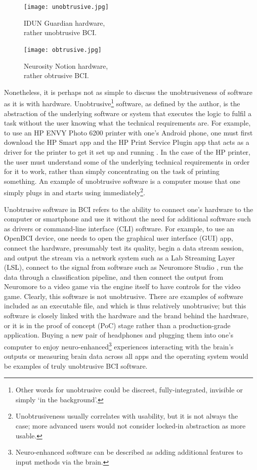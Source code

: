 \begin{figure}[!ht]
  \texttt{[image: unobtrusive.jpg]}
  \caption{IDUN Guardian hardware, \\ rather unobtrusive BCI.}
  \label{fig:unobstrusive-hardware}
  \endminipage\hfill
  \texttt{[image: obtrusive.jpg]}
  \caption{Neurosity Notion hardware, \\ rather obtrusive BCI.}
  \label{fig:obstrusive-hardware}
  \endminipage\hfill
\end{figure}

Nonetheless, it is perhaps not as simple to discuss the unobtrusiveness of software as it is with hardware. Unobtrusive\footnote{Other words for unobtrusive could be discreet, fully-integrated, invisible or simply ‘in the background’.} software, as defined by the author, is the abstraction of the underlying software or system that executes the logic to fulfil a task without the user knowing what the technical requirements are. For example, to use an HP ENVY Photo 6200 printer with one’s Android phone, one must first download the HP Smart app and the HP Print Service Plugin app that acts as a driver for the printer to get it set up and running \citep{hp_hp_nodate}. In the case of the HP printer, the user must understand some of the underlying technical requirements in order for it to work, rather than simply concentrating on the task of printing something. An example of unobtrusive software is a computer mouse that one simply plugs in and starts using immediately\footnote{Unobtrusiveness usually correlates with usability, but it is not always the case; more advanced users would not consider locked-in abstraction as more usable.}.

Unobtrusive software in BCI refers to the ability to connect one’s hardware to the computer or smartphone and use it without the need for additional software such as drivers or command-line interface (CLI) software. For example, to use an OpenBCI device, one needs to open the graphical user interface (GUI) app, connect the hardware, presumably test its quality, begin a data stream session, and output the stream via a network system such as a Lab Streaming Layer (LSL), connect to the signal from software such as Neuromore Studio \citep{openbci_neuromore_nodate}, run the data through a classification pipeline, and then connect the output from Neuromore to a video game via the engine itself to have controls for the video game. Clearly, this software is not unobtrusive. There are examples of software included as an executable file, and which is thus relatively unobtrusive; but this software is closely linked with the hardware and the brand behind the hardware, or it is in the proof of concept (PoC) stage rather than a production-grade application. Buying a new pair of headphones and plugging them into one’s computer to enjoy neuro-enhanced\footnote{Neuro-enhanced software can be described as adding additional features to input methods via the brain.} experiences interacting with the brain’s outputs or measuring brain data across all apps and the operating system would be examples of truly unobtrusive BCI software.

